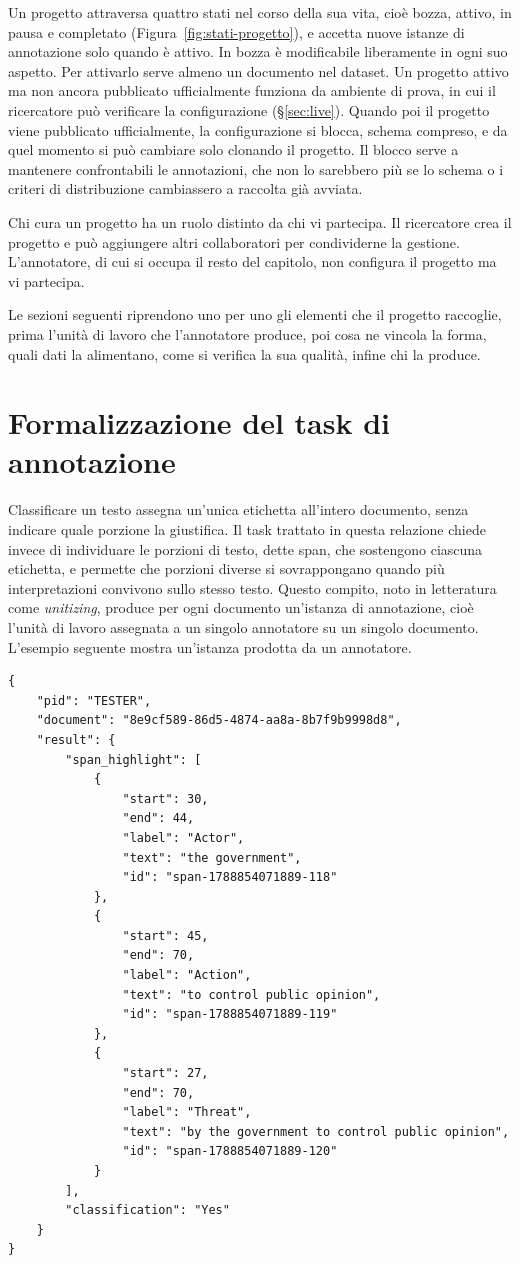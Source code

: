 \documentclass[]{sapthesis}
\begin{document}
Un progetto attraversa quattro stati nel corso della sua vita, cioè bozza, attivo, in pausa e completato (Figura~\ref{fig:stati-progetto}), e accetta nuove istanze di annotazione solo quando è attivo. In bozza è modificabile liberamente in ogni suo aspetto. Per attivarlo serve almeno un documento nel dataset. Un progetto attivo ma non ancora pubblicato ufficialmente funziona da ambiente di prova, in cui il ricercatore può verificare la configurazione (\S\ref{sec:live}). Quando poi il progetto viene pubblicato ufficialmente, la configurazione si blocca, schema compreso, e da quel momento si può cambiare solo clonando il progetto. Il blocco serve a mantenere confrontabili le annotazioni, che non lo sarebbero più se lo schema o i criteri di distribuzione cambiassero a raccolta già avviata.

Chi cura un progetto ha un ruolo distinto da chi vi partecipa. Il ricercatore crea il progetto e può aggiungere altri collaboratori per condividerne la gestione. L'annotatore, di cui si occupa il resto del capitolo, non configura il progetto ma vi partecipa.

Le sezioni seguenti riprendono uno per uno gli elementi che il progetto raccoglie, prima l'unità di lavoro che l'annotatore produce, poi cosa ne vincola la forma, quali dati la alimentano, come si verifica la sua qualità, infine chi la produce.

\section{Formalizzazione del task di annotazione}
\label{sec:task}

Classificare un testo assegna un'unica etichetta all'intero documento, senza indicare quale porzione la giustifica. Il task trattato in questa relazione chiede invece di individuare le porzioni di testo, dette span, che sostengono ciascuna etichetta, e permette che porzioni diverse si sovrappongano quando più interpretazioni convivono sullo stesso testo. Questo compito, noto in letteratura come \textit{unitizing}, produce per ogni documento un'istanza di annotazione, cioè l'unità di lavoro assegnata a un singolo annotatore su un singolo documento. L'esempio seguente mostra un'istanza prodotta da un annotatore.

\begin{lstlisting}
{
    "pid": "TESTER",
    "document": "8e9cf589-86d5-4874-aa8a-8b7f9b9998d8",
    "result": {
        "span_highlight": [
            {
                "start": 30,
                "end": 44,
                "label": "Actor",
                "text": "the government",
                "id": "span-1788854071889-118"
            },
            {
                "start": 45,
                "end": 70,
                "label": "Action",
                "text": "to control public opinion",
                "id": "span-1788854071889-119"
            },
            {
                "start": 27,
                "end": 70,
                "label": "Threat",
                "text": "by the government to control public opinion",
                "id": "span-1788854071889-120"
            }
        ],
        "classification": "Yes"
    }
}
\end{lstlisting}
\end{document}
